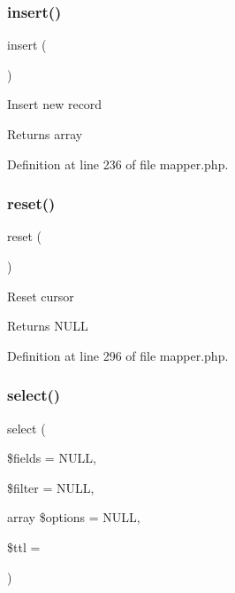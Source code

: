 \subsubsection{\texorpdfstring{insert()}{insert()}}
{\footnotesize\ttfamily insert (\begin{DoxyParamCaption}{ }\end{DoxyParamCaption})}

Insert new record \begin{DoxyReturn}{Returns}
array 
\end{DoxyReturn}


Definition at line 236 of file mapper.\+php.

\hypertarget{class_d_b_1_1_mongo_1_1_mapper_a4a20559544fdf4dcb457e258dc976cf8}{}\label{class_d_b_1_1_mongo_1_1_mapper_a4a20559544fdf4dcb457e258dc976cf8} 
\subsubsection{\texorpdfstring{reset()}{reset()}}
{\footnotesize\ttfamily reset (\begin{DoxyParamCaption}{ }\end{DoxyParamCaption})}

Reset cursor \begin{DoxyReturn}{Returns}
N\+U\+LL 
\end{DoxyReturn}


Definition at line 296 of file mapper.\+php.

\hypertarget{class_d_b_1_1_mongo_1_1_mapper_a57aa9e27404419f6796e017c7251aad4}{}\label{class_d_b_1_1_mongo_1_1_mapper_a57aa9e27404419f6796e017c7251aad4} 
\subsubsection{\texorpdfstring{select()}{select()}}
{\footnotesize\ttfamily select (\begin{DoxyParamCaption}\item[{}]{\$fields = {\ttfamily NULL},  }\item[{}]{\$filter = {\ttfamily NULL},  }\item[{array}]{\$options = {\ttfamily NULL},  }\item[{}]{\$ttl = {} }\end{DoxyParamCaption})}

